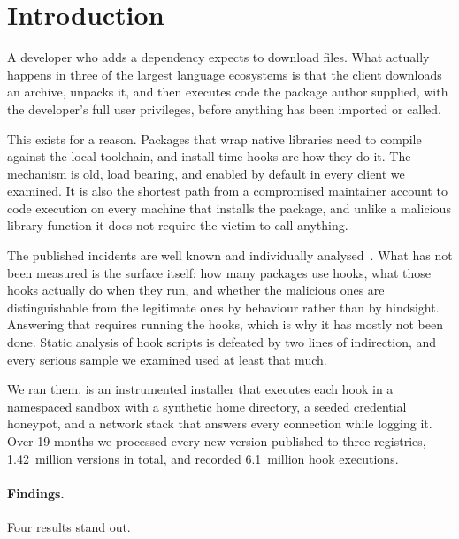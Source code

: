 \section{Introduction}
\label{sec:introduction}

A developer who adds a dependency expects to download files. What actually
happens in three of the largest language ecosystems is that the client
downloads an archive, unpacks it, and then executes code the package author
supplied, with the developer's full user privileges, before anything has been
imported or called.

This exists for a reason. Packages that wrap native libraries need to compile
against the local toolchain, and install-time hooks are how they do it. The
mechanism is old, load bearing, and enabled by default in every client we
examined. It is also the shortest path from a compromised maintainer account to
code execution on every machine that installs the package, and unlike a
malicious library function it does not require the victim to call anything.

The published incidents are well known and individually
analysed~\citep{ferrante2021incidents,mbeki2022typosquat}. What has not been
measured is the surface itself: how many packages use hooks, what those hooks
actually do when they run, and whether the malicious ones are distinguishable
from the legitimate ones by behaviour rather than by hindsight. Answering that
requires running the hooks, which is why it has mostly not been done. Static
analysis of hook scripts is defeated by two lines of indirection, and every
serious sample we examined used at least that much.

We ran them. \tool{} is an instrumented installer that executes each hook in a
namespaced sandbox with a synthetic home directory, a seeded credential
honeypot, and a network stack that answers every connection while logging it.
Over 19 months we processed every new version published to three registries,
1.42~million versions in total, and recorded 6.1~million hook executions.

\paragraph*{Findings.}
Four results stand out.

